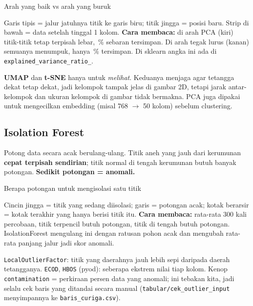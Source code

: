 \documentclass[10pt,a4paper]{article}
\newcommand{\figs}[2][0.8]{\par\begin{center}\sbox{\figbox}{}\ifdim\wd\figbox>#1\linewidth
  \resizebox{#1\linewidth}{!}{\usebox{\figbox}}\else\usebox{\figbox}\fi\end{center}\par}
\newcommand{\kode}[1]{\texttt{\small #1}}
\begin{document}
\begin{diag}[dg:pca]{Arah yang baik vs arah yang buruk}
\figs[1.0]{pca}
Garis tipis = jalur jatuhnya titik ke garis biru; titik jingga = posisi baru. Strip di bawah = data setelah tinggal 1 kolom.
\textbf{Cara membaca:} di arah PCA (kiri) titik-titik tetap terpisah lebar, \pcasatu\,\% sebaran tersimpan. Di arah tegak lurus
(kanan) semuanya menumpuk, hanya \pcadua\,\% tersimpan. Di sklearn angka ini ada di \kode{explained\_variance\_ratio\_}.
\end{diag}

\begin{luar}
\textbf{UMAP} dan \textbf{t-SNE} hanya untuk \emph{melihat}. Keduanya menjaga agar tetangga dekat tetap dekat, jadi kelompok tampak
jelas di gambar 2D, tetapi jarak antar-kelompok dan ukuran kelompok di gambar tidak bermakna. PCA juga dipakai untuk
mengecilkan embedding (misal 768 $\to$ 50 kolom) sebelum clustering.
\end{luar}

\subsection{Isolation Forest}
\begin{inti}[merah1]
Potong data secara acak berulang-ulang. Titik aneh yang jauh dari kerumunan \textbf{cepat terpisah sendirian}; titik normal di
tengah kerumunan butuh banyak potongan. \textbf{Sedikit potongan = anomali.}
\end{inti}

\begin{diag}[dg:iforest]{Berapa potongan untuk mengisolasi satu titik}
\figs[1.0]{iforest}
Cincin jingga = titik yang sedang diisolasi; garis = potongan acak; kotak berarsir = kotak terakhir yang hanya berisi titik itu.
\textbf{Cara membaca:} rata-rata 300 kali percobaan, titik terpencil butuh \ifluar{} potongan, titik di tengah butuh \iftengah{}
potongan. IsolationForest mengulang ini dengan ratusan pohon acak dan mengubah rata-rata panjang jalur jadi skor anomali.
\end{diag}

\begin{luar}
\kode{LocalOutlierFactor}: titik yang daerahnya jauh lebih sepi daripada daerah tetangganya. \kode{ECOD}, \kode{HBOS} (pyod): seberapa
ekstrem nilai tiap kolom. Kenop \kode{contamination} = perkiraan persen data yang anomali; ini tebakan kita, jadi selalu cek
baris yang ditandai secara manual (\kode{tabular/cek\_outlier\_input} menyimpannya ke \kode{baris\_curiga.csv}).
\end{luar}
\end{document}
